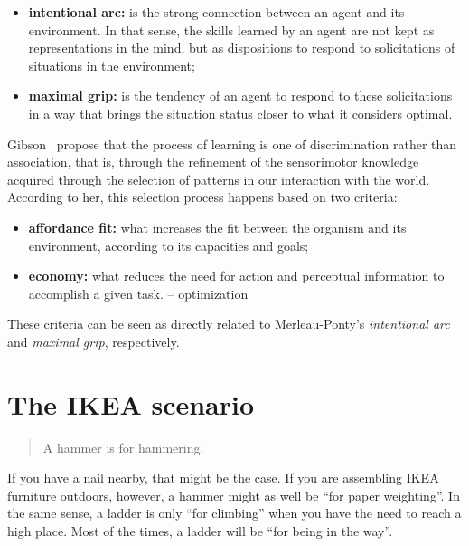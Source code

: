 \documentclass{article}
\begin{document}
\begin{itemize}
\item \textbf{intentional arc:} is the strong connection between an agent and
its environment. In that sense, the skills learned by an agent are not kept as
representations in the mind, but as dispositions to respond to solicitations of
situations in the environment;
\item \textbf{maximal grip:} is the tendency of an agent to respond to these
solicitations in a way that brings the situation status closer to what it
considers optimal.
\end{itemize}

Gibson~\cite{gibson2000} propose that the process of learning is one of
discrimination rather than association, that is, through the refinement of the
sensorimotor knowledge acquired through the selection of patterns in our
interaction with the world. According to her, this selection process happens
based on two criteria:


\begin{itemize}
\item \textbf{affordance fit:} what increases the fit between the organism and
its environment, according to its capacities and goals;
\item \textbf{economy:} what reduces the need for action and perceptual
information to accomplish a given task. -- optimization
\end{itemize}

These criteria can be seen as directly related to Merleau-Ponty's
\emph{intentional arc} and \emph{maximal grip}, respectively.


\section{The IKEA scenario}

\begin{quotation}
  A hammer is for hammering.
\end{quotation}

If you have a nail nearby, that might be the case. If you are assembling IKEA
furniture outdoors, however, a hammer might as well be ``for paper weighting''.
In the same sense, a ladder is only ``for climbing'' when you have the need to
reach a high place. Most of the times, a ladder will be
``for being in the way''.
\end{document}
